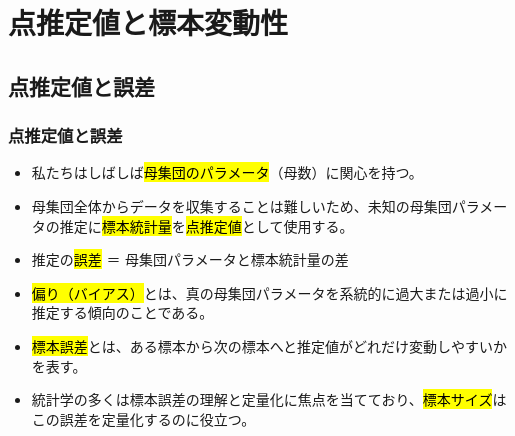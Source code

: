 
\section{点推定値と標本変動性}


\subsection{点推定値と誤差}


\begin{frame}
\frametitle{点推定値と誤差}

\begin{itemize}

\item 私たちはしばしば\hl{母集団のパラメータ}（母数）に関心を持つ。

\item 母集団全体からデータを収集することは難しいため、未知の母集団パラメータの推定に\hl{標本統計量}を\hl{点推定値}として使用する。

\item 推定の\hl{誤差} ＝ 母集団パラメータと標本統計量の差

\item \hl{偏り（バイアス）}とは、真の母集団パラメータを系統的に過大または過小に推定する傾向のことである。

\item \hl{標本誤差}とは、ある標本から次の標本へと推定値がどれだけ変動しやすいかを表す。

\item 統計学の多くは標本誤差の理解と定量化に焦点を当てており、\hl{標本サイズ}はこの誤差を定量化するのに役立つ。

\end{itemize}

\end{frame}


\begin{frame}
\frametitle{}



\end{frame}

